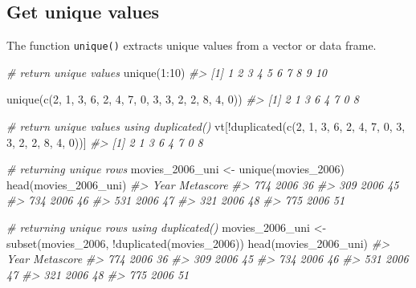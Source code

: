 \documentclass[
]{book}
\newenvironment{Shaded}{\begin{snugshade}}{\end{snugshade}}
\newcommand{\CommentTok}[1]{\textcolor[rgb]{0.56,0.35,0.01}{\textit{#1}}}
\newcommand{\DecValTok}[1]{\textcolor[rgb]{0.00,0.00,0.81}{#1}}
\newcommand{\FunctionTok}[1]{\textcolor[rgb]{0.00,0.00,0.00}{#1}}
\newcommand{\NormalTok}[1]{#1}
\newcommand{\OtherTok}[1]{\textcolor[rgb]{0.56,0.35,0.01}{#1}}
\newcommand{\SpecialCharTok}[1]{\textcolor[rgb]{0.00,0.00,0.00}{#1}}
\begin{document}
\hypertarget{get-unique-values}{%
\subsection{Get unique values}\label{get-unique-values}}

The function \texttt{unique()} extracts unique values from a vector or data frame.

\begin{Shaded}
\begin{Highlighting}[]
\CommentTok{\# return unique values}
\FunctionTok{unique}\NormalTok{(}\DecValTok{1}\SpecialCharTok{:}\DecValTok{10}\NormalTok{)}
\CommentTok{\#\textgreater{}  [1]  1  2  3  4  5  6  7  8  9 10}

\FunctionTok{unique}\NormalTok{(}\FunctionTok{c}\NormalTok{(}\DecValTok{2}\NormalTok{, }\DecValTok{1}\NormalTok{, }\DecValTok{3}\NormalTok{, }\DecValTok{6}\NormalTok{, }\DecValTok{2}\NormalTok{, }\DecValTok{4}\NormalTok{, }\DecValTok{7}\NormalTok{, }\DecValTok{0}\NormalTok{, }\DecValTok{3}\NormalTok{, }\DecValTok{3}\NormalTok{, }\DecValTok{2}\NormalTok{, }\DecValTok{2}\NormalTok{, }\DecValTok{8}\NormalTok{, }\DecValTok{4}\NormalTok{, }\DecValTok{0}\NormalTok{))}
\CommentTok{\#\textgreater{} [1] 2 1 3 6 4 7 0 8}

\CommentTok{\# return unique values using duplicated()}
\NormalTok{vt[}\SpecialCharTok{!}\FunctionTok{duplicated}\NormalTok{(}\FunctionTok{c}\NormalTok{(}\DecValTok{2}\NormalTok{, }\DecValTok{1}\NormalTok{, }\DecValTok{3}\NormalTok{, }\DecValTok{6}\NormalTok{, }\DecValTok{2}\NormalTok{, }\DecValTok{4}\NormalTok{, }\DecValTok{7}\NormalTok{, }\DecValTok{0}\NormalTok{, }\DecValTok{3}\NormalTok{, }\DecValTok{3}\NormalTok{, }\DecValTok{2}\NormalTok{, }\DecValTok{2}\NormalTok{, }\DecValTok{8}\NormalTok{, }\DecValTok{4}\NormalTok{, }\DecValTok{0}\NormalTok{))]}
\CommentTok{\#\textgreater{} [1] 2 1 3 6 4 7 0 8}

\CommentTok{\# returning unique rows}
\NormalTok{movies\_2006\_uni }\OtherTok{\textless{}{-}} \FunctionTok{unique}\NormalTok{(movies\_2006)}
\FunctionTok{head}\NormalTok{(movies\_2006\_uni)}
\CommentTok{\#\textgreater{}     Year Metascore}
\CommentTok{\#\textgreater{} 774 2006        36}
\CommentTok{\#\textgreater{} 309 2006        45}
\CommentTok{\#\textgreater{} 734 2006        46}
\CommentTok{\#\textgreater{} 531 2006        47}
\CommentTok{\#\textgreater{} 321 2006        48}
\CommentTok{\#\textgreater{} 775 2006        51}

\CommentTok{\# returning unique rows using duplicated()}
\NormalTok{movies\_2006\_uni }\OtherTok{\textless{}{-}} \FunctionTok{subset}\NormalTok{(movies\_2006, }\SpecialCharTok{!}\FunctionTok{duplicated}\NormalTok{(movies\_2006))}
\FunctionTok{head}\NormalTok{(movies\_2006\_uni)}
\CommentTok{\#\textgreater{}     Year Metascore}
\CommentTok{\#\textgreater{} 774 2006        36}
\CommentTok{\#\textgreater{} 309 2006        45}
\CommentTok{\#\textgreater{} 734 2006        46}
\CommentTok{\#\textgreater{} 531 2006        47}
\CommentTok{\#\textgreater{} 321 2006        48}
\CommentTok{\#\textgreater{} 775 2006        51}
\end{Highlighting}
\end{Shaded}
\end{document}

